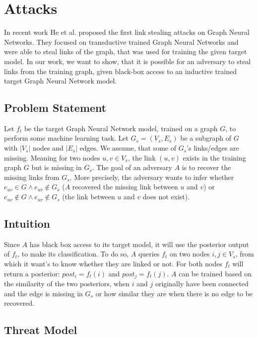 \chapter{Attacks}
\label{chapter:attacks}

  In recent work He et al. \cite{DBLP:journals/corr/abs-2005-02131} proposed the first link stealing attacks on Graph Neural Networks.
  They focused on transductive trained Graph Neural Networks and were able to steal links of the graph, that was used for training the given target model.
  In our work, we want to show, that it is possible for an adversary to steal links from the training graph, given black-box access to an inductive trained target Graph Neural Network model.

  \section{Problem Statement}

    Let $f_t$ be the target Graph Neural Network model, trained on a graph $G$, to perform some machine learning task.
    Let $G_s = (V_s, E_s)$ be a subgraph of $G$ with $|V_s|$ nodes and $|E_s|$ edges. 
    We assume, that some of $G_s$'s links/edges are missing.
    Meaning for two nodes $u,v \in V_s$, the link $(u,v)$ exists in the training graph $G$ but is missing in $G_s$.
    The goal of an adversary $A$ is to recover the missing links from $G_s$.
    More precisely, the adversary wants to infer whether $e_{uv} \in G \wedge e_{uv} \not\in G_s$ ($A$ recovered the missing link between $u$ and $v$) or $e_{uv} \not\in G \wedge e_{uv} \not\in G_s$ (the link between $u$ and $v$ does not exist).
  
  \section{Intuition}

    Since $A$ has black box access to its target model, it will use the posterior output of $f_t$, to make its classification.
    To do so, $A$ queries $f_t$ on two nodes $i,j \in V_s$, from which it want's to know whether they are linked or not.
    For both nodes $f_t$ will return a posterior: $post_i = f_t(i)$ and $post_j = f_t(j)$.
    $A$ can be trained based on the similarity of the two posteriors, when $i$ and $j$ originally have been connected and the edge is missing in $G_s$ or how similar they are when there is no edge to be recovered.


  \section{Threat Model}
  \label{section:threat-model}

